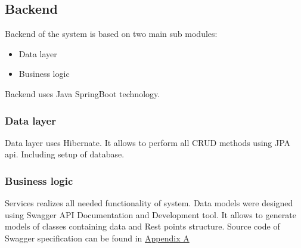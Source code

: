 \subsection{Backend}
Backend of the system is based on two main sub modules: 
\begin{itemize}
    \item Data layer
    \item Business logic 
\end{itemize}
Backend uses Java SpringBoot technology.

\subsubsection{Data layer}
Data layer uses Hibernate. It allows to perform all CRUD methods using JPA api. Including setup of database.


\subsubsection{Business logic}
Services realizes all needed functionality of system. Data models were designed using Swagger API Documentation and Development tool. It allows to generate models of classes containing data and Rest points structure. Source code of Swagger specification can be found in \hyperref[sec:appendix_a]{Appendix A}
